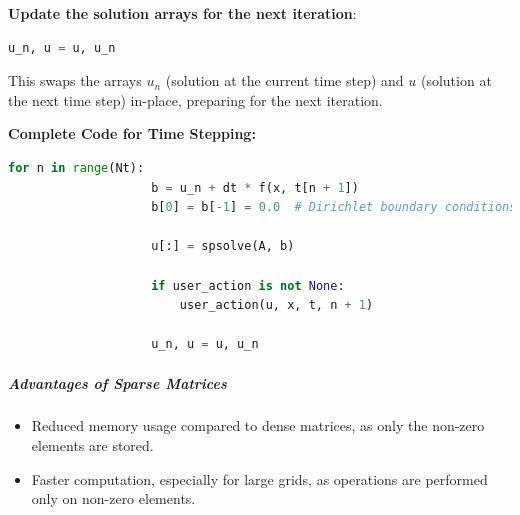 \documentclass{article}
\begin{document}
			\textbf{Update the solution arrays for the next iteration}:
			
			\begin{lstlisting}[language=Python]
				u_n, u = u, u_n
			\end{lstlisting}
			This swaps the arrays \( u_n \) (solution at the current time step) and \( u \) (solution at the next time step) in-place, preparing for the next iteration.
			
			
			\textbf{Complete Code for Time Stepping:}
			\begin{lstlisting}[language=Python]
				for n in range(Nt):
					b = u_n + dt * f(x, t[n + 1])
					b[0] = b[-1] = 0.0  # Dirichlet boundary conditions
					
					u[:] = spsolve(A, b)
					
					if user_action is not None:
						user_action(u, x, t, n + 1)
					
					u_n, u = u, u_n
			\end{lstlisting}
			\newpage
						
			
			\subparagraph{Advantages of Sparse Matrices}
			
			
			\begin{itemize}
				\item Reduced memory usage compared to dense matrices, as only the non-zero elements are stored.
				\item Faster computation, especially for large grids, as operations are performed only on non-zero elements.
			\end{itemize}
			

			
\end{document}
